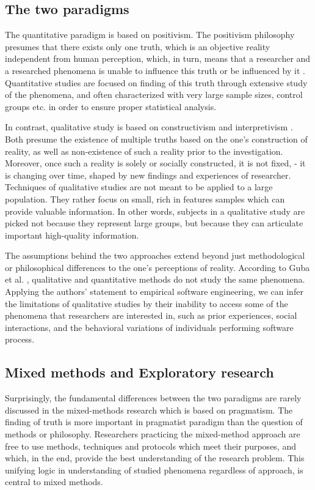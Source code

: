 \subsection{The two paradigms}
The quantitative paradigm is based on positivism. The positivism philosophy presumes that there exists only one truth, which is an objective reality independent from human perception, which, in turn, means that a researcher and a researched phenomena is unable to influence this truth or be influenced by it \cite{GubaLincoln-CompetingParadigms}. Quantitative studies are focused on finding of this truth through extensive study of the phenomena, and often characterized with very large sample sizes, control groups etc. in order to ensure proper statistical analysis.

In contrast, qualitative study is based on constructivism \cite{citeulike:209817} \cite{GubaLincoln-CompetingParadigms} and interpretivism \cite{citeulike:447180}. Both presume the existence of multiple truths based on the one's construction of reality, as well as non-existence of such a reality prior to the investigation. Moreover, once such a reality is solely or socially constructed, it is not fixed, - it is changing over time, shaped by new findings and experiences of researcher. Techniques of qualitative studies are not meant to be applied to a large population. They rather focus on small, rich in features samples which can provide valuable information. In other words, subjects in a qualitative study are picked not because they represent large groups, but because they can articulate important high-quality information.

The assumptions behind the two approaches extend beyond just methodological or philosophical differences to the one's perceptions of reality. According to Guba et al. \cite{GubaLincoln-CompetingParadigms}, qualitative and quantitative methods do not study the same phenomena. Applying the authors' statement to empirical software engineering, we can infer the limitations of qualitative studies by their inability to access some of the phenomena that researchers are interested in, such as prior experiences, social interactions, and the behavioral variations of individuals performing software process.  

\subsection{Mixed methods and Exploratory research}
Surprisingly, the fundamental differences between the two paradigms are rarely discussed in the mixed-methods research which is based on pragmatism. The finding of truth is more important in pragmatist paradigm than the question of methods or philosophy. Researchers practicing the mixed-method approach are free to use methods, techniques and protocols which meet their purposes, and which, in the end, provide the best understanding of the research problem. This unifying logic in understanding of studied phenomena regardless of approach, is central to mixed methods.

